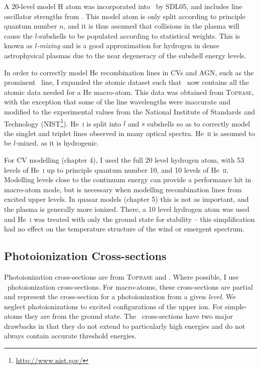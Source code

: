 A 20-level model H atom was incorporated into \py\ by SDL05,
and includes line oscillator strengths from \cite{menzel1935}.
This model atom is only split according to principle quantum number $n$,
and it is thus assumed that collisions in the plasma will cause 
the $l$-subshells to be populated according to statistical weights. 
This is known as {\em $l$-mixing} and is a good approximation for hydrogen in
dense astrophysical plasmas due to the near degeneracy of the subshell 
energy levels.

In order to correctly model He recombination lines in CVs and AGN, such as the 
prominent \heiiuv\ line, I expanded the atomic dataset such that \py\
now contains all the atomic data needed for a He macro-atom. This data was 
obtained from \textsc{Topbase}, with the exception that some of the line wavelengths
were inaccurate and modified to the experimental values from the National 
Institute of Standards and Technology (NIST\footnote{\url{http://www.nist.gov/}}).
He~\textsc{i} is split into $l$ and $s$ subshells so as to correctly model the
singlet and triplet lines observed in many optical spectra. He~\textsc{ii} is assumed
to be $l$-mixed, as it is hydrogenic.

For CV modelling (chapter 4), I used the full 20 level hydrogen atom, with 53 levels of 
He~\textsc{i} up to principle quantum number 10, and 10 levels of He~\textsc{ii}. 
Modelling levels close to the continuum energy can
provide a performance hit in macro-atom mode, but is necessary
when modelling recombination lines from excited 
upper levels. In quasar models (chapter 5) 
this is not as important, and the
plasma is generally more ionized. There, a 10 level hydrogen atom was used and
He~\textsc{i} was treated with only the ground state for stability -- this simplification
had no effect on the temperature structure of the wind or emergent spectrum.

\subsection{Photoionization Cross-sections}

Photoionization cross-sections are from \textsc{Topbase} \citep{cunto1993} and \cite{vfky}.
Where possible, I use \top\ photoionization cross-sections. For macro-atoms,
these cross-sections are partial and represent the cross-section for a photoionization
from a given {\em level}. We neglect photoionizations to excited configurations
of the upper ion. For simple-atoms they are from the ground state.
The \top\ cross-sections have two major drawbacks in that they do not 
extend to particularly high energies and do not always contain accurate threshold
energies.

